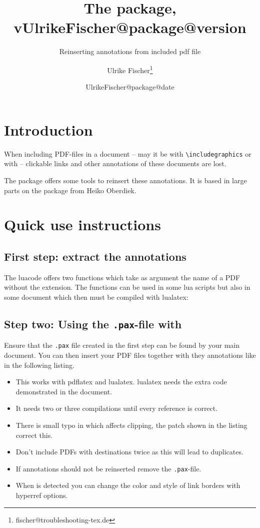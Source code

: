 \documentclass[DIV=12,parskip=half-,bibliography=totoc]{scrartcl}
\title{The \pkg{newpax} package, v\csname UlrikeFischer@package@version\endcsname}
\subtitle{Reinserting annotations from included pdf file}
\date{\csname UlrikeFischer@package@date\endcsname}
\author{Ulrike Fischer\thanks{fischer@troubleshooting-tex.de}}
\begin{document}
\maketitle

\section{Introduction}

When including PDF-files in a document -- may it be with \verb+\includegraphics+ or with \verb++ -- clickable links and other annotations of these documents are lost.

The   package offers some tools to reinsert these annotations. It is based in large parts
on the  package from Heiko Oberdiek.

\section{Quick use instructions}
\subsection{First step: extract the annotations}
The luacode offers two functions which take as argument the name of a PDF without the extension.
The functions can be used in some lua scripts but also in some document which then must be compiled
with lualatex:



\subsection{Step two: Using the \texttt{.pax}-file with }

Ensure that the \texttt{.pax} file created in the first step can be found by your main document. You can then insert your
PDF files together with they annotations like in the following listing.

\begin{itemize}
\item This works with pdflatex and lualatex. lualatex needs the extra code demonstrated in the document.
\item It needs two or three compilations until every reference is correct.
\item There is small typo in  which affects clipping, the patch shown in the listing correct this.
\item Don't include PDFs with destinations twice as this will lead to duplicates.
\item If annotations should not be reinserted remove the \texttt{.pax}-file. 
\item When  is detected you can change the color and style of link borders with hyperref options. 
\end{itemize}
\end{document}

